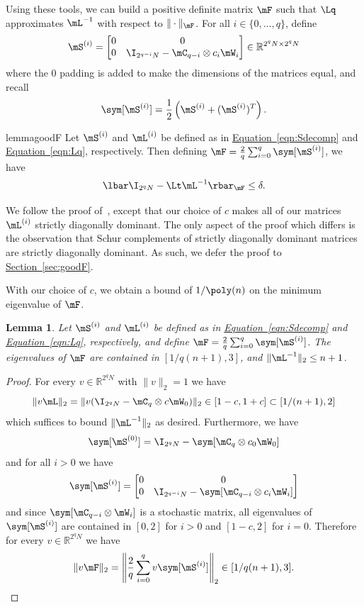 \documentclass[11pt]{article}
\newcommand{\expref}[2]{\texorpdfstring{\hyperref[#2]{#1~\ref{#2}}}{#1~\ref{#2}}}
\newcommand{\expeqref}[2]{\texorpdfstring{\hyperref[#2]{#1~\eqref{#2}}}{#1~\eqref{#2}}}
\newtheorem{lemma}[theorem]{Lemma}
\newcommand{\R}{{\mathbb R}}
\begin{document}
Using these tools, we can build a positive definite matrix $\mF$ such that $\Lq$ approximates $\mL^{-1}$ with respect to $\|\cdot\|_{\mF}$.
For all $i\in \{0,\ldots,q\}$, define 
\begin{equation}
    \mS^{(i)}=\begin{bmatrix}0 & 0\\ 0 & \I_{2^{q-i}N}-\mC_{q-i}\otimes c_{i}\mW_i \end{bmatrix} \in \R^{2^qN\times 2^qN}\label{eqn:Sdecomp}
\end{equation}
where the $0$ padding is added to make the dimensions of the matrices equal, and recall
\[\sym[\mS^{(i)}] = \frac{1}{2}\left(\mS^{(i)}+(\mS^{(i)})^T\right).\]

\begin{restatable}{lemma}{goodF}\label{lem:goodF}
Let $\mS^{(i)}$ and $\mL^{(i)}$ be defined as in \expeqref{Equation}{eqn:Sdecomp} and \expeqref{Equation}{eqn:Lq}, respectively. %
Then defining
$\mF=\frac{2}{q}\sum_{i=0}^q\sym[\mS^{(i)}]$, we have %
$$\lbar \I_{2^qN}-\Lt\mL^{-1}\rbar_\mF\leq \delta.$$
\end{restatable}
We follow the proof of~\cite{AhmadinejadKeMuPeSiVa19}, except that our choice of $c$ makes all of our matrices $\mL^{(i)}$ %
strictly diagonally dominant. The only aspect of the proof which differs is the observation that Schur complements of strictly diagonally dominant matrices are strictly diagonally dominant. As such, we defer the proof to \expref{Section}{sec:goodF}.

With our choice of $c$, we obtain a bound of $1/\poly(n)$ on the minimum eigenvalue of $\mF$.
\begin{lemma}\label{lem:condF}
Let $\mS^{(i)}$ and $\mL^{(i)}$ be defined as in \expeqref{Equation}{eqn:Sdecomp} and \expeqref{Equation}{eqn:Lq}, respectively, %
and define
$\mF=\frac{2}{q}\sum_{i=0}^q\sym[\mS^{(i)}]$. The eigenvalues of $\mF$ are contained in $[1/q(n+1),3]$, and $\|\mL^{-1}\|_2\leq n+1$.
\end{lemma}
\begin{proof}
For every $v \in \R^{2^qN}$ with $\|v\|_2=1$ we have  
\[\|v\mL\|_2=\|v(\I_{2^qN}- \mC_q\otimes c\mW_0)\|_2 \in [1-c,1+c]\subset[1/(n+1),2]\]
which suffices to bound $\|\mL^{-1}\|_2$ as desired. Furthermore, we have
\[\sym[\mS^{(0)}]=\I_{2^{q}N}-\sym[\mC_{q}\otimes c_{0}\mW_0]\]
and for all $i>0$ we have
\[\sym[\mS^{(i)}]=\begin{bmatrix}0 & 0\\ 0 & \I_{2^{q-i}N}-\sym[\mC_{q-i}\otimes c_{i}\mW_i] \end{bmatrix}\]
and since $\sym[\mC_{q-i}\otimes \mW_i]$ is a stochastic matrix, all eigenvalues of $\sym[\mS^{(i)}]$ are contained in $[0,2]$ for $i>0$ and $[1-c,2]$ for $i=0$. Therefore for every $v\in \R^{2^qN}$ we have
\[\|v\mF\|_2=\left\|\frac{2}{q}\sum_{i=0}^q v\sym[\mS^{(i)}]\right\|_2 \in [1/q(n+1),3]. \qedhere\] 
\end{proof}
\end{document}
